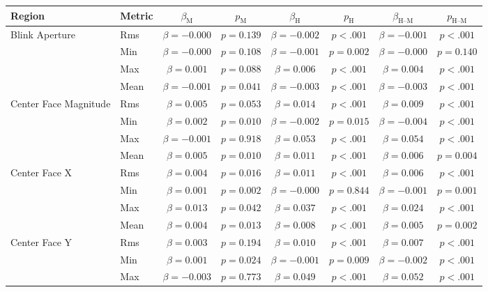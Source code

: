 \begin{tabular}{llcc|cc|cc}
\toprule
Region & Metric & $\beta_{\text{M}}$ & $p_{\text{M}}$ & $\beta_{\text{H}}$ & $p_{\text{H}}$ & $\beta_{\text{H--M}}$ & $p_{\text{H--M}}$ \\
\midrule
\multirow{4}{*}{Blink Aperture} & Rms & $\beta = -0.000$ & $p = 0.139$ & $\beta = -0.002$ & $p < .001$ & $\beta = -0.001$ & $p < .001$ \\
 & Min & $\beta = -0.000$ & $p = 0.108$ & $\beta = -0.001$ & $p = 0.002$ & $\beta = -0.000$ & $p = 0.140$ \\
 & Max & $\beta = 0.001$ & $p = 0.088$ & $\beta = 0.006$ & $p < .001$ & $\beta = 0.004$ & $p < .001$ \\
 & Mean & $\beta = -0.001$ & $p = 0.041$ & $\beta = -0.003$ & $p < .001$ & $\beta = -0.003$ & $p < .001$ \\
\midrule
\multirow{4}{*}{Center Face Magnitude} & Rms & $\beta = 0.005$ & $p = 0.053$ & $\beta = 0.014$ & $p < .001$ & $\beta = 0.009$ & $p < .001$ \\
 & Min & $\beta = 0.002$ & $p = 0.010$ & $\beta = -0.002$ & $p = 0.015$ & $\beta = -0.004$ & $p < .001$ \\
 & Max & $\beta = -0.001$ & $p = 0.918$ & $\beta = 0.053$ & $p < .001$ & $\beta = 0.054$ & $p < .001$ \\
 & Mean & $\beta = 0.005$ & $p = 0.010$ & $\beta = 0.011$ & $p < .001$ & $\beta = 0.006$ & $p = 0.004$ \\
\midrule
\multirow{4}{*}{Center Face X} & Rms & $\beta = 0.004$ & $p = 0.016$ & $\beta = 0.011$ & $p < .001$ & $\beta = 0.006$ & $p < .001$ \\
 & Min & $\beta = 0.001$ & $p = 0.002$ & $\beta = -0.000$ & $p = 0.844$ & $\beta = -0.001$ & $p = 0.001$ \\
 & Max & $\beta = 0.013$ & $p = 0.042$ & $\beta = 0.037$ & $p < .001$ & $\beta = 0.024$ & $p < .001$ \\
 & Mean & $\beta = 0.004$ & $p = 0.013$ & $\beta = 0.008$ & $p < .001$ & $\beta = 0.005$ & $p = 0.002$ \\
\midrule
\multirow{4}{*}{Center Face Y} & Rms & $\beta = 0.003$ & $p = 0.194$ & $\beta = 0.010$ & $p < .001$ & $\beta = 0.007$ & $p < .001$ \\
 & Min & $\beta = 0.001$ & $p = 0.024$ & $\beta = -0.001$ & $p = 0.009$ & $\beta = -0.002$ & $p < .001$ \\
 & Max & $\beta = -0.003$ & $p = 0.773$ & $\beta = 0.049$ & $p < .001$ & $\beta = 0.052$ & $p < .001$ \\

\end{tabular}
